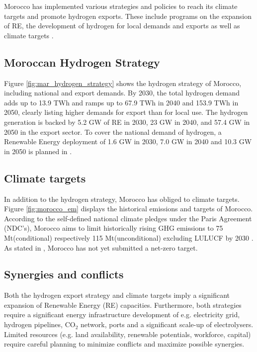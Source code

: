 Morocco has implemented various strategies and policies to reach its climate targets and promote hydrogen exports. These include programs on the expansion of RE, the development of hydrogen for local demands and exports as well as climate targets \cite{MarHyStrat2021, CAT2021}.


\subsection{Moroccan Hydrogen Strategy}
\label{subsec:strategy}
Figure \ref{fig:mar_hydrogen_strategy} shows the hydrogen strategy of Morocco, including national and export demands.
By 2030, the total hydrogen demand adds up to 13.9 TWh and ramps up to 67.9 TWh in 2040 and 153.9 TWh in 2050, 
clearly listing higher demands for export than for local use. The hydrogen generation is backed by 5.2 GW of RE in 2030, 23 GW in 2040, and 57.4 GW in 2050 in the export sector. To cover the national demand of hydrogen, a Renewable Energy deployment of 1.6 GW in 2030, 7.0 GW in 2040 and 10.3 GW in 2050 is planned in \cite{MarHyStrat2021}.


\subsection{Climate targets}
\label{subsec:climate_targets}
In addition to the hydrogen strategy, Morocco has obliged to climate targets. Figure \ref{fig:morocco_em} displays the historical emissions and targets of Morocco.
According to the self-defined national climate pledges under the Paris Agreement (NDC's), Morocco aims to limit historically rising GHG emissions to 75 Mt\coe (conditional) respectively 115 Mt\coe (unconditional) excluding LULUCF by 2030 \cite{CAT2021}. 
As stated in \cite{CAT2021}, Morocco has not yet submitted a net-zero target. 

\subsection{Synergies and conflicts}
Both the hydrogen export strategy and climate targets imply a significant expansion of Renewable Energy (RE) capacities. Furthermore, both strategies require a significant energy infrastructure development of e.g. electricity grid, hydrogen pipelines, $\mathrm{CO_2}$ network, ports and a significant scale-up of electrolysers.
Limited resources (e.g. land availability, renewable potentials, workforce, capital) require careful planning to minimize conflicts and maximize possible synergies.

